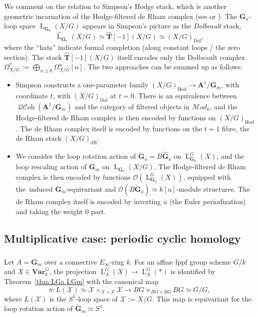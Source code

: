 \documentclass[12pt, oneside]{amsart}
\numberwithin{equation}{section}
\theoremstyle{remark}
\theoremstyle{plain}
\renewcommand{\ge}{\geqslant}
\newcommand{\MOD}{\mathcal{M}\textit{od}}
\DeclareMathOperator{\QCOH}{\mathcal{QC}\textit{oh}}
\newcommand{\Loop}{\operatorname{L}}
\newcommand{\OO}{\mathcal{O}}
\newcommand{\XX}{\mathcal{X}}
\newcommand{\GG}{\mathbf{G}}
\newcommand{\GGhat}{\widehat{\mathbf{G}}}
\newcommand{\GGa}{\mathbf{G}_{a}}
\newcommand{\GGm}{\mathbf{G}_{m}}
\newcommand{\Var}{\mathbf{Var}_{k}}
\newcommand{\TT}{\mathbf{T}}
\newcommand{\aff}{\mathbf{A}^1}
\begin{document}
We comment on the relation to Simpson's Hodge stack, which is another geometric incarnation of the Hodge-filtered de Rham complex (see \cite{Simp} or \cite{BhattFGauges}).
The $\GGa$-loop space $\Loop_{\GGa}(X/G)$ appears in Simpson's picture as the \emph{Dolbeault} stack,
\[ \widehat{\Loop}_{\GGa}(X/G) \simeq \widehat{\TT}[-1](X/G) \simeq (X/G)_{\mathrm{Dol}}, \]
where the ``hats'' indicate formal completion (along constant loops / the zero section).
The stack $\widehat{\TT}[-1](X/G)$ itself encodes only the Dolbeault complex $\Omega^*_{X/G} := \bigoplus_{n \ge 0} \Omega^n_{X/G}[n]$.
The two approaches can be summed up as follows:
\begin{itemize}
  \item Simpson constructs a one-parameter family $(X/G)_{\mathrm{Hod}} \to \mathbf{A}^1/\GGm$, with coordinate $t$, with $(X/G)_{\mathrm{Dol}}$ at $t=0$.
  There is an equivalence between $\QCOH(\aff/\GGm)$ and the category of filtered objects in $\MOD_k$, and the Hodge-filtered de Rham complex is then encoded by functions on $(X/G)_{\mathrm{Hod}}$.
  The de Rham complex itself is encoded by functions on the $t=1$ fibre, the de Rham stack $(X/G)_{\mathrm{dR}}$.
  \item We consider the loop rotation action of $\check{\GG}_a = B\GGhat_a$ on $\Loop_{\GGa}^G(X)$, and the loop rescaling action of $\GGm$ on $\Loop_{\GGa}(X/G)$.
  The Hodge-filtered de Rham complex is then encoded by functions $\OO(\Loop_{\GGa}^G(X))$, equipped with the induced $\GGm$-equivariant and $\OO(B\check{\GG}_a) \simeq k[u]$-module structures.
  The de Rham complex itself is encoded by inverting $u$ (the Euler periodization) and taking the weight $0$ part.
\end{itemize}

\subsection{Multiplicative case: periodic cyclic homology}
\label{ssec:TP/KU}

\subsubsection{}

Let $A = \GGm$ over a connective $E_\infty$-ring $k$.
For an affine fppf group scheme $G/k$ and $X \in \Var^G$, the projection $\Loop_A^G(X) \to \Loop_A^G(*)$ is identified by Theorem~\ref{thm:LGa LGm} with the canonical map
\[ \pi : L(\XX) \simeq \XX \times_{\XX \times \XX} \XX \to BG \times_{BG \times BG} BG \simeq G/G, \]
where $L(\XX)$ is the $S^1$-loop space of $\XX := X/G$.
This map is equivariant for the loop rotation action of $\check{\GG}_m \simeq S^1$.
\end{document}
